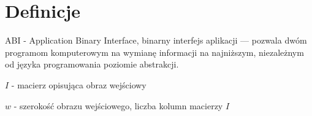 \chapter{Definicje}
\begin{list}{}{\leftmargin=0em}

\item ABI - Application Binary Interface, binarny interfejs aplikacji --- pozwala dwóm programom komputerowym na wymianę informacji na najniższym, niezależnym od języka programowania poziomie abstrakcji.

\item $I$ - macierz opisująca obraz wejściowy
\item $w$ - szerokość obrazu wejściowego, liczba kolumn macierzy $I$


\end{list}

